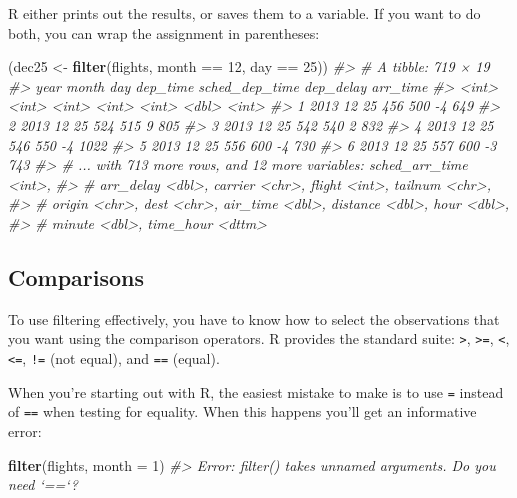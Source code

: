\documentclass[]{book}
\newenvironment{Shaded}{\begin{snugshade}}{\end{snugshade}}
\newcommand{\KeywordTok}[1]{\textcolor[rgb]{0.13,0.29,0.53}{\textbf{{#1}}}}
\newcommand{\DataTypeTok}[1]{\textcolor[rgb]{0.13,0.29,0.53}{{#1}}}
\newcommand{\DecValTok}[1]{\textcolor[rgb]{0.00,0.00,0.81}{{#1}}}
\newcommand{\StringTok}[1]{\textcolor[rgb]{0.31,0.60,0.02}{{#1}}}
\newcommand{\CommentTok}[1]{\textcolor[rgb]{0.56,0.35,0.01}{\textit{{#1}}}}
\newcommand{\NormalTok}[1]{{#1}}
\begin{document}
R either prints out the results, or saves them to a variable. If you
want to do both, you can wrap the assignment in parentheses:

\begin{Shaded}
\begin{Highlighting}[]
\NormalTok{(dec25 <-}\StringTok{ }\KeywordTok{filter}\NormalTok{(flights, month ==}\StringTok{ }\DecValTok{12}\NormalTok{, day ==}\StringTok{ }\DecValTok{25}\NormalTok{))}
\CommentTok{#> # A tibble: 719 × 19}
\CommentTok{#>    year month   day dep_time sched_dep_time dep_delay arr_time}
\CommentTok{#>   <int> <int> <int>    <int>          <int>     <dbl>    <int>}
\CommentTok{#> 1  2013    12    25      456            500        -4      649}
\CommentTok{#> 2  2013    12    25      524            515         9      805}
\CommentTok{#> 3  2013    12    25      542            540         2      832}
\CommentTok{#> 4  2013    12    25      546            550        -4     1022}
\CommentTok{#> 5  2013    12    25      556            600        -4      730}
\CommentTok{#> 6  2013    12    25      557            600        -3      743}
\CommentTok{#> # ... with 713 more rows, and 12 more variables: sched_arr_time <int>,}
\CommentTok{#> #   arr_delay <dbl>, carrier <chr>, flight <int>, tailnum <chr>,}
\CommentTok{#> #   origin <chr>, dest <chr>, air_time <dbl>, distance <dbl>, hour <dbl>,}
\CommentTok{#> #   minute <dbl>, time_hour <dttm>}
\end{Highlighting}
\end{Shaded}

\hypertarget{comparisons}{\subsection{Comparisons}\label{comparisons}}

To use filtering effectively, you have to know how to select the
observations that you want using the comparison operators. R provides
the standard suite: \texttt{\textgreater{}}, \texttt{\textgreater{}=},
\texttt{\textless{}}, \texttt{\textless{}=}, \texttt{!=} (not equal),
and \texttt{==} (equal).

When you're starting out with R, the easiest mistake to make is to use
\texttt{=} instead of \texttt{==} when testing for equality. When this
happens you'll get an informative error:

\begin{Shaded}
\begin{Highlighting}[]
\KeywordTok{filter}\NormalTok{(flights, }\DataTypeTok{month =} \DecValTok{1}\NormalTok{)}
\CommentTok{#> Error: filter() takes unnamed arguments. Do you need `==`?}
\end{Highlighting}
\end{Shaded}
\end{document}
